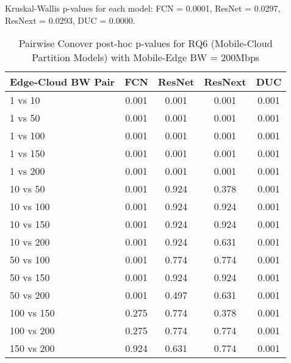 \begin{table}[h]
\centering
\caption{Pairwise Conover post-hoc p-values for RQ6 (Mobile-Cloud Partition Models) with Mobile-Edge BW = 200Mbps}
\label{tab:conover_mobile_cloud_partition_me200}
\smallskip
Kruskal-Wallis p-values for each model: FCN = 0.0001, ResNet = 0.0297, ResNext = 0.0293, DUC = 0.0000.

\begin{tabular}{lcccc}
\toprule
Edge-Cloud BW Pair & FCN & ResNet & ResNext & DUC \\
\midrule
1 vs 10 & 0.001 & 0.001 & 0.001 & 0.001 \\
1 vs 50 & 0.001 & 0.001 & 0.001 & 0.001 \\
1 vs 100 & 0.001 & 0.001 & 0.001 & 0.001 \\
1 vs 150 & 0.001 & 0.001 & 0.001 & 0.001 \\
1 vs 200 & 0.001 & 0.001 & 0.001 & 0.001 \\
10 vs 50 & 0.001 & 0.924 & 0.378 & 0.001 \\
10 vs 100 & 0.001 & 0.924 & 0.924 & 0.001 \\
10 vs 150 & 0.001 & 0.924 & 0.924 & 0.001 \\
10 vs 200 & 0.001 & 0.924 & 0.631 & 0.001 \\
50 vs 100 & 0.001 & 0.774 & 0.774 & 0.001 \\
50 vs 150 & 0.001 & 0.924 & 0.924 & 0.001 \\
50 vs 200 & 0.001 & 0.497 & 0.631 & 0.001 \\
100 vs 150 & 0.275 & 0.774 & 0.378 & 0.001 \\
100 vs 200 & 0.275 & 0.774 & 0.774 & 0.001 \\
150 vs 200 & 0.924 & 0.631 & 0.774 & 0.001 \\
\bottomrule
\end{tabular}
\end{table}

